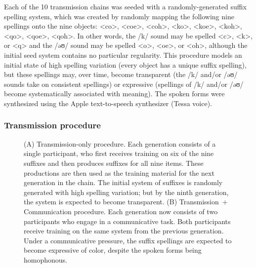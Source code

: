 \documentclass[doc,biblatex]{apa7}
\begin{document}
Each of the 10 transmission chains was seeded with a randomly-generated suffix spelling system, which was created by randomly mapping the following nine spellings onto the nine objects: <co>, <coe>, <coh>, <ko>, <koe>, <koh>, <qo>, <qoe>, <qoh>. In other words, the /k/ sound may be spelled <c>, <k>, or <q> and the /əʊ/ sound may be spelled <o>, <oe>, or <oh>, although the initial seed system contains no particular regularity. This procedure models an initial state of high spelling variation (every object has a unique suffix spelling), but these spellings may, over time, become transparent (the /k/ and/or /əʊ/ sounds take on consistent spellings) or expressive (spellings of /k/ and/or /əʊ/ become systematically associated with meaning). The spoken forms were synthesized using the Apple text-to-speech synthesizer (Tessa voice).

\subsubsection{Transmission procedure}

	\begin{figure}
	\vspace*{2pt}
	\caption{(A) Transmission-only procedure. Each generation consists of a single participant, who first receives training on six of the nine suffixes and then produces suffixes for all nine items. These productions are then used as the training material for the next generation in the chain. The initial system of suffixes is randomly generated with high spelling variation; but by the ninth generation, the system is expected to become transparent. (B) Transmission~+ Communication procedure. Each generation now consists of two participants who engage in a communicative task. Both participants receive training on the same system from the previous generation. Under a communicative pressure, the suffix spellings are expected to become expressive of color, despite the spoken forms being homophonous.}
	\label{transmission}
	\end{figure}
\end{document}
